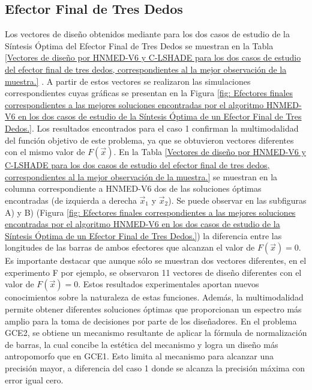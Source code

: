 \subsection{Efector Final de Tres Dedos}
Los vectores de diseño obtenidos mediante para los dos casos
de estudio de la Síntesis Óptima del  Efector Final de Tres Dedos se muestran en la Tabla \ref{Vectores de diseño por HNMED-V6 y C-LSHADE para los dos casos de estudio del efector final de tres dedos, correspondientes al la mejor observación de la muestra.} . A partir de estos vectores se realizaron las simulaciones correspondientes cuyas gráficas se presentan en la Figura \ref{fig: Efectores finales  correspondientes a las mejores soluciones encontradas por el algoritmo HNMED-V6 en los dos casos de estudio de la Síntesis Óptima de un Efector Final de Tres Dedos.}. Los resultados encontrados para el caso 1 confirman la multimodalidad del función objetivo de este problema, ya que se obtuvieron vectores diferentes con el mismo valor de $F(\vec{x})$. En la Tabla \ref{Vectores de diseño por HNMED-V6 y C-LSHADE para los dos casos de estudio del efector final de tres dedos, correspondientes al la mejor observación de la muestra.} se muestran en la columna correspondiente a HNMED-V6 dos de las soluciones óptimas encontradas (de izquierda a derecha $\vec{x}_1$ y $\vec{x}_2$). Se puede observar en las subfiguras A) y B) (Figura \ref{fig: Efectores finales  correspondientes a las mejores soluciones encontradas por el algoritmo HNMED-V6 en los dos casos de estudio de la Síntesis Óptima de un Efector Final de Tres Dedos.}) la diferencia entre las longitudes de las barras de ambos efectores que alcanzan el valor de $F(\vec{x})=0$. Es importante destacar que aunque sólo se muestran dos vectores diferentes, en el experimento F por ejemplo, se observaron 11 vectores de diseño diferentes con el valor de $F(\vec{x})=0$. Estos resultados experimentales aportan nuevos conocimientos sobre la naturaleza de estas funciones. Además, la multimodalidad permite obtener diferentes soluciones óptimas que proporcionan un espectro más amplio para la toma de decisiones por parte de los diseñadores. En el problema GCE2, se obtiene un mecanismo resultante de aplicar la fórmula de normalización de barras, la cual concibe la estética del mecanismo y logra un diseño más antropomorfo que en GCE1. Esto limita al mecanismo para alcanzar una precisión mayor, a diferencia del caso 1 donde se alcanza la precisión máxima con error igual cero.
